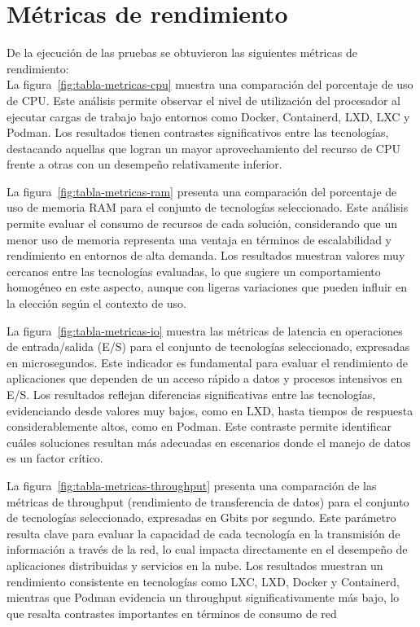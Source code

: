 \section{Métricas de rendimiento}
\noindent
De la ejecución de las pruebas se obtuvieron las siguientes métricas de rendimiento: \\

\noindent
La figura~\ref{fig:tabla-metricas-cpu} muestra una comparación del porcentaje de uso de CPU. Este análisis permite observar el nivel de utilización del procesador al ejecutar cargas de trabajo bajo entornos como Docker, Containerd, LXD, LXC y Podman. Los resultados tienen contrastes significativos entre las tecnologías, destacando aquellas que logran un mayor aprovechamiento del recurso de CPU frente a otras con un desempeño relativamente inferior.


\noindent
La figura~\ref{fig:tabla-metricas-ram} presenta una comparación del porcentaje de uso de memoria RAM para el conjunto de tecnologías seleccionado. Este análisis permite evaluar el consumo de recursos de cada solución, considerando que un menor uso de memoria representa una ventaja en términos de escalabilidad y rendimiento en entornos de alta demanda. Los resultados muestran valores muy cercanos entre las tecnologías evaluadas, lo que sugiere un comportamiento homogéneo en este aspecto, aunque con ligeras variaciones que pueden influir en la elección según el contexto de uso.


\noindent
La figura~\ref{fig:tabla-metricas-io} muestra las métricas de latencia en operaciones de entrada/salida (E/S) para el conjunto de tecnologías seleccionado, expresadas en microsegundos. Este indicador es fundamental para evaluar el rendimiento de aplicaciones que dependen de un acceso rápido a datos y procesos intensivos en E/S. Los resultados reflejan diferencias significativas entre las tecnologías, evidenciando desde valores muy bajos, como en LXD, hasta tiempos de respuesta considerablemente altos, como en Podman. Este contraste permite identificar cuáles soluciones resultan más adecuadas en escenarios donde el manejo de datos es un factor crítico.


\noindent
La figura~\ref{fig:tabla-metricas-throughput} presenta una comparación de las métricas de throughput (rendimiento de transferencia de datos) para el conjunto de tecnologías seleccionado, expresadas en Gbits por segundo. Este parámetro resulta clave para evaluar la capacidad de cada tecnología en la transmisión de información a través de la red, lo cual impacta directamente en el desempeño de aplicaciones distribuidas y servicios en la nube. Los resultados muestran un rendimiento consistente en tecnologías como LXC, LXD, Docker y Containerd, mientras que Podman evidencia un throughput significativamente más bajo, lo que resalta contrastes importantes en términos de consumo de red



